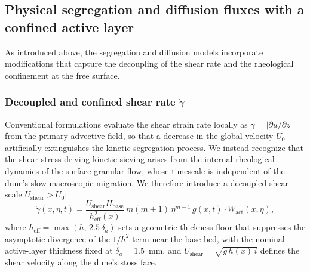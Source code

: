 \documentclass[lineno]{JFM-FLM_Au}
\begin{document}
\subsection{Physical segregation and diffusion fluxes with a confined active layer}
\label{sec:segdiff}

As introduced above, the segregation and diffusion models incorporate modifications that capture the decoupling of the shear rate and the rheological confinement at the free surface.

\subsubsection{Decoupled and confined shear rate $\dot\gamma$}
\label{sec:shearrate}

Conventional formulations evaluate the shear strain rate locally as $\dot\gamma = |\partial u/\partial z|$ from the primary advective field, so that a decrease in the global velocity $U_0$ artificially extinguishes the kinetic segregation process. We instead recognize that the shear stress driving kinetic sieving arises from the internal rheological dynamics of the surface granular flow, whose timescale is independent of the dune's slow macroscopic migration. We therefore introduce a decoupled shear scale $U_{\mathrm{shear}} > U_0$:
\begin{equation}
    \dot\gamma(x,\eta,t) = \frac{U_{\mathrm{shear}} H_{\mathrm{base}}}{h_{\mathrm{eff}}^2(x)}\, m(m+1)\,\eta^{m-1}\, g(x,t)\cdot W_{\mathrm{act}}(x,\eta),
    \label{eq:shearrate}
\end{equation}
where $h_{\mathrm{eff}} = \max(h,\,2.5\,\delta_a)$ sets a geometric thickness floor that suppresses the asymptotic divergence of the $1/h^2$ term near the base bed, with the nominal active-layer thickness fixed at $\delta_a = 1.5$~mm, and $U_{\mathrm{shear}} = \sqrt{g\,h(x)\,i}$ defines the shear velocity along the dune's stoss face.
\end{document}
